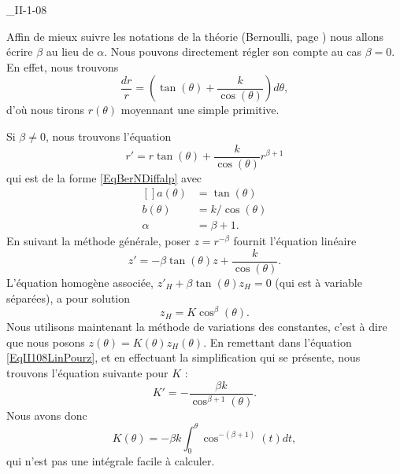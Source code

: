 

\begin{corrige}{_II-1-08}

Affin de mieux suivre les notations de la théorie (Bernoulli, page \pageref{SubSecBernh}) nous allons écrire $\beta$ au lieu de $\alpha$. Nous pouvons directement régler son compte au cas $\beta=0$. En effet, nous trouvons
\begin{equation}
	\frac{ dr }{ r }=\left( \tan(\theta)+\frac{ k }{ \cos(\theta) } \right)d\theta,
\end{equation}
d'où nous tirons $r(\theta)$ moyennant une simple primitive.

Si $\beta\neq 0$, nous trouvons l'équation
\begin{equation}
	r'=r\tan(\theta)+\frac{ k }{ \cos(\theta) }r^{\beta+1}
\end{equation}
qui est de la forme \eqref{EqBerNDiffalp} avec
\begin{equation}
	\begin{aligned}[]
		a(\theta)	&=\tan(\theta)\\
		b(\theta)	&=k/\cos(\theta)\\
		\alpha		&=\beta+1.
	\end{aligned}
\end{equation}
En suivant la méthode générale, poser $z=r^{-\beta}$ fournit l'équation linéaire
\begin{equation}		\label{EqII108LinPourz}
	z'=-\beta\tan(\theta) z+\frac{ k }{ \cos(\theta) }.
\end{equation}
L'équation homogène associée, $z'_H+\beta\tan(\theta)z_H=0$ (qui est à variable séparées), a pour solution
\begin{equation}
	z_H=K\cos^{\beta}(\theta).
\end{equation}
Nous utilisons maintenant la méthode de variations des constantes, c'est à dire que nous posons $z(\theta)=K(\theta)z_H(\theta)$. En remettant dans l'équation \ref{EqII108LinPourz}, et en effectuant la simplification qui se présente, nous trouvons l'équation suivante pour $K$ :
\begin{equation}
	K'=-\frac{ \beta k }{ \cos^{\beta+1}(\theta) }.
\end{equation}
Nous avons donc
\begin{equation}
	K(\theta)=-\beta k\int_0^{\theta}\cos^{-(\beta+1)}(t)dt,
\end{equation}
qui n'est pas une intégrale facile à calculer.


\end{corrige}
